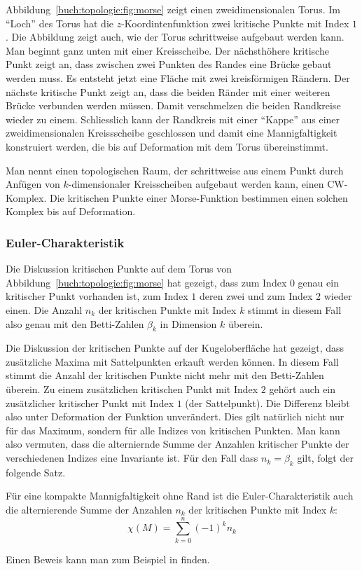Abbildung~\ref{buch:topologie:fig:morse} zeigt einen zweidimensionalen
Torus.
Im ``Loch'' des Torus hat die $z$-Koordintenfunktion zwei kritische Punkte
mit Index $1$.
Die Abbildung zeigt auch, wie der Torus schrittweise aufgebaut werden
kann.
Man beginnt ganz unten mit einer Kreisscheibe.
Der nächsthöhere kritische Punkt zeigt an, dass zwischen zwei Punkten
des Randes eine Brücke gebaut werden muss.
Es entsteht jetzt eine Fläche mit zwei kreisförmigen Rändern.
Der nächste kritische Punkt zeigt an, dass die beiden Ränder mit
einer weiteren Brücke verbunden werden müssen.
Damit verschmelzen die beiden Randkreise wieder zu einem.
Schliesslich kann der Randkreis mit einer ``Kappe'' aus einer
zweidimensionalen Kreissscheibe geschlossen und damit eine
Mannigfaltigkeit konstruiert werden, die bis auf Deformation mit dem
Torus übereinstimmt.

Man nennt einen topologischen Raum, der schrittweise aus einem Punkt
durch Anfügen von $k$-dimensionaler Kreisscheiben aufgebaut werden kann,
einen CW-Komplex.
Die kritischen Punkte einer Morse-Funktion bestimmen einen solchen
Komplex bis auf Deformation.

%
%
\subsubsection{Euler-Charakteristik}
Die Diskussion kritischen Punkte auf dem Torus von
Abbildung~\ref{buch:topologie:fig:morse} hat gezeigt,
dass zum Index $0$ genau ein kritischer Punkt vorhanden ist,
zum Index $1$ deren zwei und zum Index 2 wieder einen.
Die Anzahl $n_k$ der kritischen Punkte mit Index $k$ stimmt in diesem Fall
also genau mit den Betti-Zahlen $\beta_k$ in Dimension $k$ überein.

Die Diskussion der kritischen Punkte auf der Kugeloberfläche
hat gezeigt, dass zusätzliche Maxima mit Sattelpunkten erkauft werden
können.
In diesem Fall stimmt die Anzahl der kritischen Punkte nicht mehr
mit den Betti-Zahlen überein.
Zu einem zusätzlichen kritischen Punkt mit Index $2$ gehört auch
ein zusätzlicher kritischer Punkt mit Index $1$ (der Sattelpunkt).
Die Differenz bleibt also unter Deformation der Funktion unverändert.
Dies gilt natürlich nicht nur für das Maximum, sondern für alle Indizes
von kritischen Punkten.
Man kann also vermuten, dass die alterniernde Summe der Anzahlen
kritischer Punkte der verschiedenen Indizes eine Invariante ist.
Für den Fall dass $n_k=\beta_k$ gilt, folgt der folgende Satz.

\begin{satz}
Für eine kompakte Mannigfaltigkeit ohne Rand ist die Euler-Charakteristik
auch die alternierende Summe der Anzahlen $n_k$ der kritischen Punkte 
mit Index $k$:
\[
\chi(M)
=
\sum_{k=0}^n (-1)^k n_k
\]
\end{satz}

Einen Beweis kann man zum Beispiel in \cite{buch:hirsch} finden.


